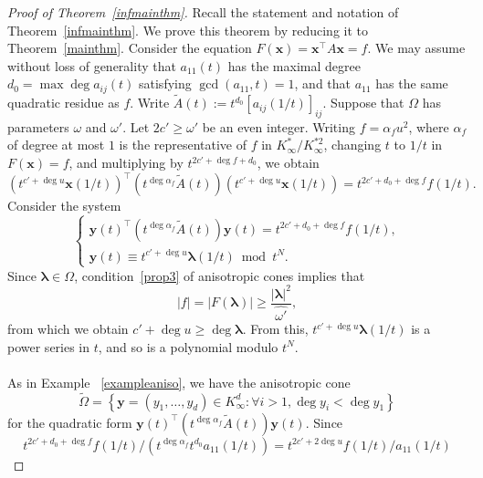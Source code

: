 \documentclass[10pt]{amsart}
\theoremstyle{plain}
\theoremstyle{plain}
\renewcommand{\vec}[1]{\mathbf{#1}}
\theoremstyle{remark}
\theoremstyle{definition}
\renewcommand{\hat}{\widehat}
\newcommand{\Ki}{K_\infty}
\begin{document}
\begin{proof}[Proof of Theorem~\ref{infmainthm}]
Recall the statement and notation of Theorem~\ref{infmainthm}. We prove this theorem by reducing it to Theorem~\ref{mainthm}. Consider the equation $F(\vec{x})=\vec{x}^{\intercal}A\vec{x}=f$. We may assume without loss of generality that $a_{11}(t)$ has the maximal degree $d_0=\max\deg a_{ij}(t)$ satisfying $\gcd(a_{11},t)=1$, and that $a_{11}$ has the same quadratic residue as $f$. Write $\tilde{A}(t):=t^{d_0}[a_{ij}(1/t)]_{ij}$. Suppose that $\Omega$ has parameters $\omega$ and $\omega'$. Let $2c'\geq\omega'$ be an even integer. Writing $f=\alpha_fu^2$, where $\alpha_f$ of degree at most $1$ is the representative of $f$ in $\Ki^{*}/\Ki^{*2}$, changing $t$ to $1/t$ in $F(\vec{x})=f$, and multiplying by $t^{2c'+\deg f+d_0}$, we obtain
\[\left(t^{c'+\deg u}\vec{x}(1/t)\right)^{\intercal}\left(t^{\deg\alpha_f}\tilde{A}(t)\right)\left(t^{c'+\deg u}\vec{x}(1/t)\right)=t^{2c'+d_0+\deg f}f(1/t).\]
Consider the system 
\begin{equation}\label{system}\begin{cases}\vec{y}(t)^{\intercal}\left(t^{\deg\alpha_f}\tilde{A}(t)\right)\vec{y}(t)=t^{2c'+d_0+\deg f}f(1/t),\\ \vec{y}(t)\equiv t^{c'+\deg u}\boldsymbol{\lambda}(1/t)\bmod t^N.\end{cases}\end{equation}
Since $\boldsymbol{\lambda}\in\Omega$, condition~\eqref{prop3} of anisotropic cones implies that
\[|f|=|F(\boldsymbol{\lambda})|\geq \frac{|\boldsymbol{\lambda}|^2}{\hat{\omega'}},\]
from which we obtain $c'+\deg u\geq\deg\boldsymbol{\lambda}$. From this, $t^{c'+\deg u}\boldsymbol{\lambda}(1/t)$ is a power series in $t$, and so is a polynomial modulo $t^N$.\\
\\
As in Example ~\ref{exampleaniso}, we have the anisotropic cone 
\[\tilde{\Omega}=\left\{\vec{y}=(y_1,\hdots,y_d)\in\Ki^d:\forall i>1, \deg y_i<\deg y_1\right\}\]
for the quadratic form $\vec{y}(t)^{\intercal}\left(t^{\deg\alpha_f}\tilde{A}(t)\right)\vec{y}(t)$. Since 
\[t^{2c'+d_0+\deg f}f(1/t)/(t^{\deg\alpha_f}t^{d_0}a_{11}(1/t))=t^{2c'+2\deg u}f(1/t)/a_{11}(1/t)\]

\end{proof}
\end{document}
